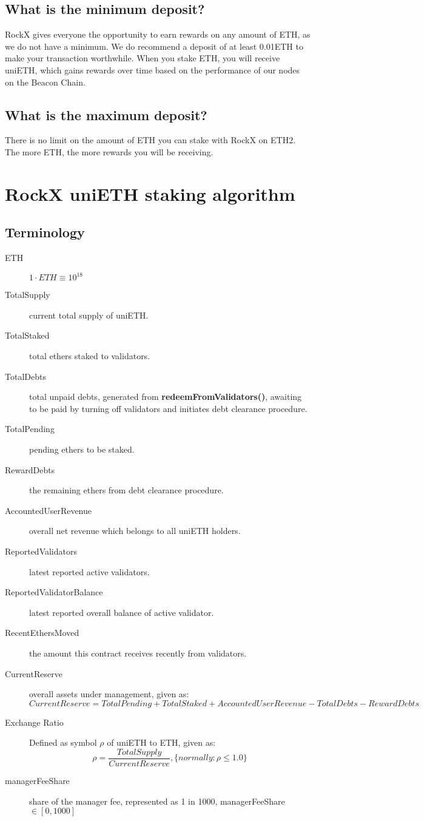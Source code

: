 \documentclass{article}
\begin{document}
\subsection{What is the minimum deposit?}
RockX gives everyone the opportunity to earn rewards on any amount of ETH, as we do not have a minimum. We do recommend a deposit of at least 0.01ETH to make your transaction worthwhile. When you stake ETH, you will receive uniETH, which gains rewards over time based on the performance of our nodes on the Beacon Chain.

\subsection{What is the maximum deposit?}
There is no limit on the amount of ETH you can stake with RockX on ETH2. The more ETH, the more rewards you will be receiving.

\section{RockX uniETH staking algorithm}

\subsection{Terminology}
\begin{description}
   \item[ETH] $1\cdot ETH \equiv 10^{18}$
   \item[TotalSupply] current total supply of uniETH.
   \item[TotalStaked] total ethers staked to validators.
   \item[TotalDebts] total unpaid debts, generated from \textbf{redeemFromValidators()}, awaiting to be paid by turning off validators and initiates debt clearance procedure.
   \item[TotalPending] pending ethers to be staked.
   \item[RewardDebts] the remaining ethers from debt clearance procedure.
   \item[AccountedUserRevenue] overall net revenue which belongs to all uniETH holders.
   \item[ReportedValidators] latest reported active validators.
   \item[ReportedValidatorBalance] latest reported overall balance of active validator.
   \item[RecentEthersMoved] the amount this contract receives recently from validators.
   \item[CurrentReserve] overall assets under management, given as:
   \[CurrentReserve = TotalPending + TotalStaked + AccountedUserRevenue - TotalDebts - RewardDebts\]
   \item[Exchange Ratio] Defined as symbol $\rho$ of uniETH to ETH, given as: 
    \[\rho = \frac{TotalSupply}{CurrentReserve} , \{normally: \rho \leq 1.0\} \]
   \item[managerFeeShare] share of the manager fee, represented as 1 in 1000, managerFeeShare $\in[0,1000]$ 
\end{description}
\end{document}
